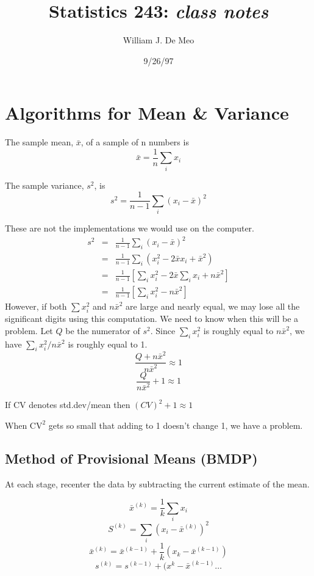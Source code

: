 \documentclass{article}
\begin{document}
\title{Statistics 243: \emph{class notes}}
\author{William J. De Meo}
\date{9/26/97 }
\maketitle
\section{Algorithms for Mean \& Variance}
\begin{definition}
The sample mean, $\bar x$, of a sample of n numbers is
\[\bar x = \frac{1}{n}\sum_i x_i \]
\end{definition}

\begin{definition}
The sample variance, $s^2$, is 
\[s^2 = \frac{1}{n-1}\sum_i (x_i - \bar x)^2 \]
\end{definition}
These are not the implementations we would use on the computer.
\begin{eqnarray*}
s^2 & = & \frac{1}{n-1}\sum_i (x_i - \bar x)^2\\
& = & \frac{1}{n-1}\sum_i(x_i^2 - 2\bar x x_i + \bar{x}^2)\\
& = & \frac{1}{n-1}\left[\sum_i x_i^2 -2\bar x \sum_i x_i +n\bar{x}^2\right]\\
& = & \frac{1}{n-1}\left[\sum_i x_i^2 - n\bar{x}^2\right]
\end{eqnarray*}
However, if both $\sum x_i^2$ and $n\bar{x}^2$ are large and nearly equal,
we may lose all the significant digits using this computation.
We need to know when this will be a problem.  Let $Q$ be the numerator
of $s^2$. Since $\sum_i x_i^2$ is roughly equal to $n\bar{x}^2$, we have
$\sum_i x_i^2 / n\bar{x}^2$ is roughly equal to 1.
\[ \frac{Q + n\bar{x}^2}{n\bar{x}^2} \approx 1\]
\[ \frac{Q}{n\bar{x}^2} + 1 \approx 1 \]

If CV denotes std.dev/mean then $(CV)^2 +1 \approx 1$

When $\mbox{CV}^2$ gets so small that adding to 1 doesn't change 1, we have a problem.

\subsection{Method of Provisional Means (BMDP)}
At each stage, recenter the data by subtracting the current estimate
of the mean.
\begin{definition}
\[\bar{x}^{(k)}= \frac{1}{k}\sum_i x_i \]
\[S^{(k)} = \sum_i (x_i - \bar{x}^{(k)})^2 \]
\[\bar{x}^{(k)} = \bar{x}^{(k-1)} + \frac{1}{k}(x_k - \bar{x}^{(k-1)})\]
\[s^{(k)} = s^{(k-1)} + (x^k - \bar{x}^{(k-1)} \ldots \]
\end{definition}
\end{document}
